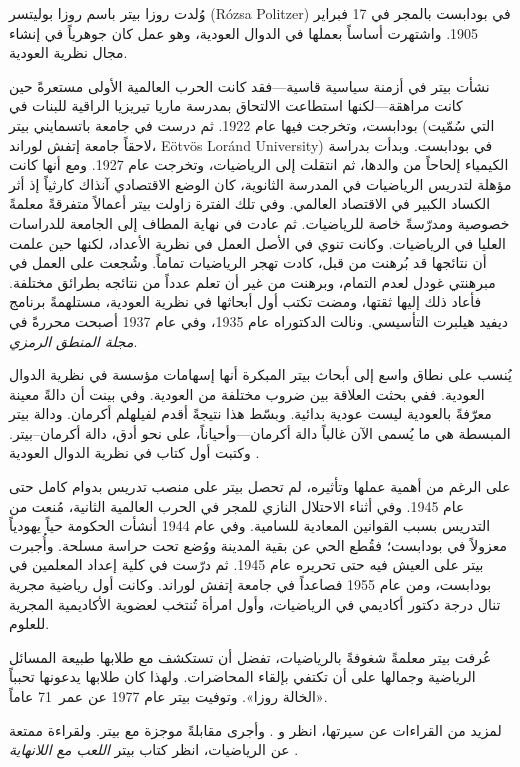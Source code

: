 \documentclass[../../../include/open-logic-section]{subfiles}
\begin{document}



وُلدت روزا بيتر باسم روزا بوليتسر (R\'ozsa Politzer) في بودابست بالمجر
في 17 فبراير 1905. واشتهرت أساساً بعملها في الدوال العودية، وهو عمل
كان جوهرياً في إنشاء مجال نظرية العودية.

نشأت بيتر في أزمنة سياسية قاسية---فقد كانت الحرب العالمية الأولى مستعرةً
حين كانت مراهقة---لكنها استطاعت الالتحاق بمدرسة ماريا تيريزيا الراقية
للبنات في بودابست، وتخرجت فيها عام 1922. ثم درست في جامعة باتسمايني بيتر
(التي سُمّيت لاحقاً جامعة إتفش لوراند، E\"otv\"os Lor\'and University)
في بودابست. وبدأت بدراسة الكيمياء إلحاحاً من والدها، ثم انتقلت إلى
الرياضيات، وتخرجت عام 1927. ومع أنها كانت مؤهلة لتدريس الرياضيات في
المدرسة الثانوية، كان الوضع الاقتصادي آنذاك كارثياً إذ أثر الكساد الكبير
في الاقتصاد العالمي. وفي تلك الفترة زاولت بيتر أعمالاً متفرقةً معلمةً
خصوصية ومدرّسةً خاصة للرياضيات. ثم عادت في نهاية المطاف إلى الجامعة
للدراسات العليا في الرياضيات. وكانت تنوي في الأصل العمل في نظرية الأعداد،
لكنها حين علمت أن نتائجها قد بُرهنت من قبل، كادت تهجر الرياضيات تماماً.
وشُجعت على العمل في مبرهنتي غودل لعدم التمام، وبرهنت من غير أن تعلم عدداً
من نتائجه بطرائق مختلفة. فأعاد ذلك إليها ثقتها، ومضت تكتب أول أبحاثها في
نظرية العودية، مستلهمةً برنامج ديفيد هيلبرت التأسيسي. ونالت الدكتوراه
عام 1935، وفي عام 1937 أصبحت محررةً في \emph{مجلة المنطق الرمزي}.

يُنسب على نطاق واسع إلى أبحاث بيتر المبكرة أنها إسهامات مؤسسة في نظرية
الدوال العودية. ففي \cite{Peter1935a} بحثت العلاقة بين ضروب مختلفة
من العودية. وفي \cite{Peter1935b} بينت أن دالةً معينة معرّفةً بالعودية
ليست عودية بدائية. وبسّط هذا نتيجةً أقدم لفيلهلم أكرمان. ودالة بيتر
المبسطة هي ما يُسمى الآن غالباً دالة أكرمان---وأحياناً، على نحو أدق، دالة
أكرمان--بيتر. وكتبت أول كتاب في نظرية الدوال العودية
\citep{Peter1951}.

على الرغم من أهمية عملها وتأثيره، لم تحصل بيتر على منصب تدريس بدوام كامل
حتى عام 1945. وفي أثناء الاحتلال النازي للمجر في الحرب العالمية الثانية،
مُنعت من التدريس بسبب القوانين المعادية للسامية. وفي عام 1944 أنشأت
الحكومة حياً يهودياً معزولاً في بودابست؛ فقُطع الحي عن بقية المدينة ووُضع
تحت حراسة مسلحة. وأُجبرت بيتر على العيش فيه حتى تحريره عام 1945. ثم درّست
في كلية إعداد المعلمين في بودابست، ومن عام 1955 فصاعداً في جامعة إتفش
لوراند. وكانت أول رياضية مجرية تنال درجة دكتور أكاديمي في الرياضيات، وأول
امرأة تُنتخب لعضوية الأكاديمية المجرية للعلوم.

عُرفت بيتر معلمةً شغوفةً بالرياضيات، تفضل أن تستكشف مع طلابها طبيعة
المسائل الرياضية وجمالها على أن تكتفي بإلقاء المحاضرات. ولهذا كان طلابها
يدعونها تحبباً «الخالة روزا». وتوفيت بيتر عام 1977 عن عمر~71 عاماً.

\begin{reading}
لمزيد من القراءات عن سيرتها، انظر \citep{Oconnor2014} و
\citep{Andrasfai1986}. وأجرى \citet{Tamassy1994} مقابلةً موجزة مع بيتر.
ولقراءة ممتعة عن الرياضيات، انظر كتاب بيتر \emph{اللعب مع اللانهاية}
\citep{Peter2010}.
\end{reading}
\end{document}
